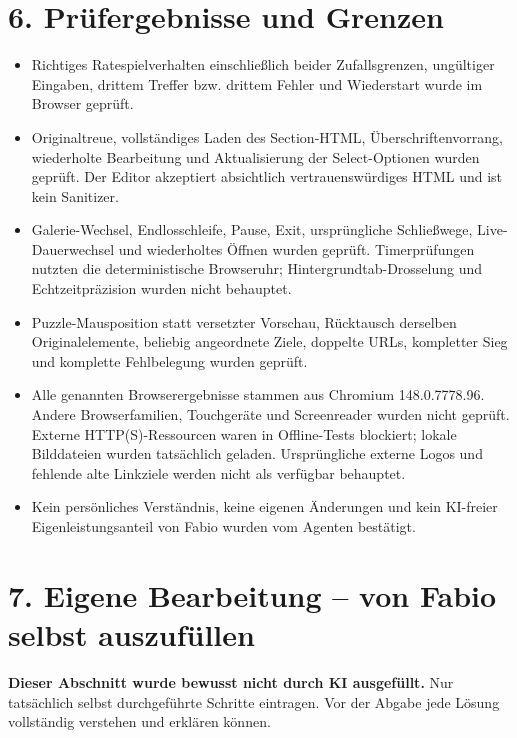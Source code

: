 \documentclass[11pt,a4paper]{article}
\begin{document}
\section*{6. Prüfergebnisse und Grenzen}
\begin{itemize}
\item Richtiges Ratespielverhalten einschließlich beider Zufallsgrenzen, ungültiger Eingaben, drittem Treffer bzw. drittem Fehler und Wiederstart wurde im Browser geprüft.
\item Originaltreue, vollständiges Laden des Section-HTML, Überschriftenvorrang, wiederholte Bearbeitung und Aktualisierung der Select-Optionen wurden geprüft. Der Editor akzeptiert absichtlich vertrauenswürdiges HTML und ist kein Sanitizer.
\item Galerie-Wechsel, Endlosschleife, Pause, Exit, ursprüngliche Schließwege, Live-Dauerwechsel und wiederholtes Öffnen wurden geprüft. Timerprüfungen nutzten die deterministische Browseruhr; Hintergrundtab-Drosselung und Echtzeitpräzision wurden nicht behauptet.
\item Puzzle-Mausposition statt versetzter Vorschau, Rücktausch derselben Originalelemente, beliebig angeordnete Ziele, doppelte URLs, kompletter Sieg und komplette Fehlbelegung wurden geprüft.
\item Alle genannten Browserergebnisse stammen aus Chromium 148.0.7778.96. Andere Browserfamilien, Touchgeräte und Screenreader wurden nicht geprüft. Externe HTTP(S)-Ressourcen waren in Offline-Tests blockiert; lokale Bilddateien wurden tatsächlich geladen. Ursprüngliche externe Logos und fehlende alte Linkziele werden nicht als verfügbar behauptet.
\item Kein persönliches Verständnis, keine eigenen Änderungen und kein KI-freier Eigenleistungsanteil von Fabio wurden vom Agenten bestätigt.
\end{itemize}

\clearpage
\section*{7. Eigene Bearbeitung -- von Fabio selbst auszufüllen}
\textbf{Dieser Abschnitt wurde bewusst nicht durch KI ausgefüllt.} Nur tatsächlich selbst durchgeführte Schritte eintragen. Vor der Abgabe jede Lösung vollständig verstehen und erklären können.
\end{document}
